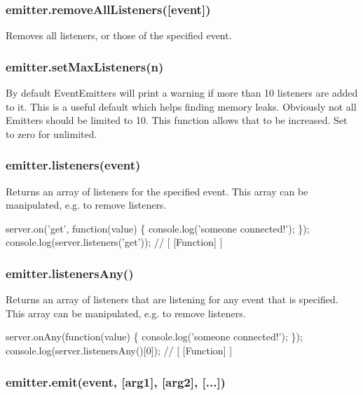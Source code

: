 \subsubsection*{emitter.\+remove\+All\+Listeners(\mbox{[}event\mbox{]})}

Removes all listeners, or those of the specified event.

\subsubsection*{emitter.\+set\+Max\+Listeners(n)}

By default Event\+Emitters will print a warning if more than 10 listeners are added to it. This is a useful default which helps finding memory leaks. Obviously not all Emitters should be limited to 10. This function allows that to be increased. Set to zero for unlimited.

\subsubsection*{emitter.\+listeners(event)}

Returns an array of listeners for the specified event. This array can be manipulated, e.\+g. to remove listeners.


\begin{DoxyCode}
server.on('get', function(value) \{
  console.log('someone connected!');
\});
console.log(server.listeners('get')); // [ [Function] ]
\end{DoxyCode}


\subsubsection*{emitter.\+listeners\+Any()}

Returns an array of listeners that are listening for any event that is specified. This array can be manipulated, e.\+g. to remove listeners.


\begin{DoxyCode}
server.onAny(function(value) \{
  console.log('someone connected!');
\});
console.log(server.listenersAny()[0]); // [ [Function] ]
\end{DoxyCode}


\subsubsection*{emitter.\+emit(event, \mbox{[}arg1\mbox{]}, \mbox{[}arg2\mbox{]}, \mbox{[}...\mbox{]})}

